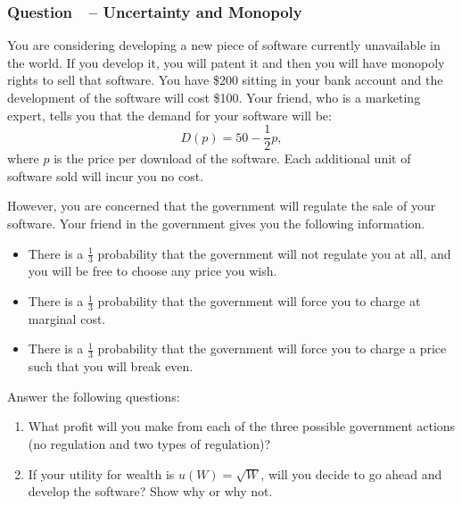 \documentclass[12pt]{article}
\newcounter{question}[section]
\newcommand{\question}[1]{\refstepcounter{question}
  \subsubsection*{Question~\thequestion~-- #1}}
\newenvironment{subquestions}{
  \begin{enumerate}[label=(\roman*)]}{\end{enumerate}}
\begin{document}
\question{Uncertainty and Monopoly}
You are considering developing a new piece of software currently unavailable in
the world. If you develop it, you will patent it and then you will have monopoly
rights to sell that software.
You have \$200 sitting in your bank account and the development of the software
will cost \$100. Your friend, who is a marketing expert, tells you that the
demand for your software will be:
\[
  D\left( p \right)=50-\frac{1}{2}p,
\]
where $p$ is the
price per download of the software. Each additional unit of software sold
will incur you no cost.

However, you are concerned that the government will regulate the sale of your
software.  Your friend in the government gives you the following information.
\begin{itemize}
  \item There is a $\frac{1}{3}$ probability that the government will not
    regulate you at all, and you will be free to choose any price you wish.
  \item There is a $\frac{1}{3}$ probability that the government will force you
    to charge at marginal cost.
  \item There is a $\frac{1}{3}$ probability that the government will force you
    to charge a price such that you will break even.
\end{itemize}
Answer the following questions:
\begin{subquestions}
\item What profit will you make from each of the three
  possible government actions (no regulation and two types of regulation)?
  \item If your utility for wealth is $u\left( W
    \right)=\sqrt{W}$, will you decide to go ahead and develop the software?
    Show why or why not.
\end{subquestions}
\end{document}
